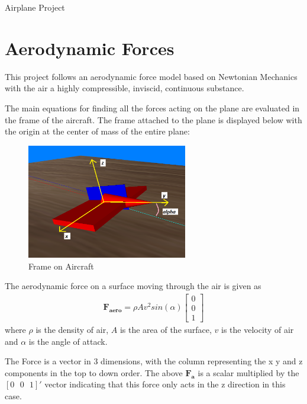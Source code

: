 \documentclass[10pt,a4paper]{article}
\begin{document}
\begin{center}

\large{Airplane Project}

\end{center}

\section{Aerodynamic Forces}

This project follows an aerodynamic force model based on Newtonian Mechanics with the air a highly compressible, inviscid, continuous substance.

The main equations for finding all the forces acting on the plane are evaluated in the frame of the aircraft. The frame attached to the plane is displayed below with the origin at the center of mass of the entire plane:

\begin{figure}[h]
\begin{center}
\includegraphics[trim = 0cm 0cm 0cm 0cm, clip, width=7cm]{fig1.png}
\end{center}
\caption{Frame on Aircraft}
\end{figure}

The aerodynamic force on a surface moving through the air is given as
\begin{align}
\boldsymbol{F_{\text{aero}}} = \rho A v^2 sin(\alpha)
\begin{bmatrix}
0 \\ 0 \\ 1
\end{bmatrix}
\end{align}
where
$\rho$ is the density of air,
$A$ is the area of the surface,
$v$ is the velocity of air and
$\alpha$ is the angle of attack.

The Force is a vector in 3 dimensions, with the column representing the x y and z components in the top to down order. The above $\boldsymbol{F_a}$ is a scalar multiplied by the $[0 \text{ }0 \text{ } 1]'$ vector indicating that this force only acts in the z direction in this case.
\end{document}
